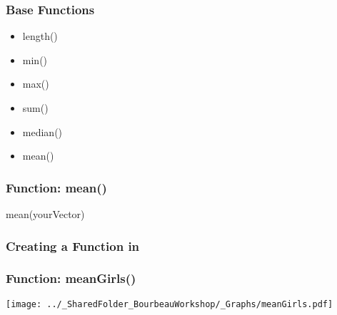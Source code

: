 \documentclass{beamer}
\begin{document}
    \begin{frame}
        \frametitle{\R Base Functions}
        \begin{itemize}
            \item length()
            \item min()
            \item max()
            \item sum()
            \item median()
            \item mean()
        \end{itemize}
    \end{frame}
        
    \begin{frame}[fragile=singleslide]
        \frametitle{\R Function: mean()}
        \begin{code}
mean(yourVector)
        \end{code}
    \end{frame}
    

    \begin{frame}[fragile=singleslide]
        \frametitle{Creating a Function in \R}
    \end{frame}
    
    \begin{frame}
        \frametitle{\R Function: meanGirls()} \vspace{1cm}
        \begin{center}
            \texttt{[image: ../\_SharedFolder\_BourbeauWorkshop/\_Graphs/meanGirls.pdf]}
        \end{center}
    \end{frame}
    
\end{document}
